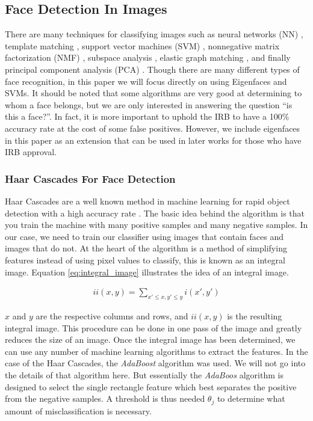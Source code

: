 \documentclass[
	submission,
	final,
	notitlepage,
	narroweqnarray,
	inline,
	twoside,
	]{ieee}
\begin{document}
\subsection{Face Detection In Images}
There are many techniques for classifying images such as neural
networks (NN) \cite{face_neural_net}, template matching \cite{face_template}, support vector machines (SVM) \cite{face_svm}, 
nonnegative matrix factorization (NMF) \cite{face_mat_fact}, subspace analysis \cite{face_subspace_analysis}, 
elastic graph matching \cite{face_elastic_bunch}, and finally principal component analysis (PCA) \cite{face_kpca}. 
Though there are many different types of face recognition, in this paper we 
will focus directly on using Eigenfaces and SVMs. It should be noted 
that some algorithms are very good at determining to whom a face
belongs, but we are only interested in answering the question  
``is this a face?''. In fact, it is more important to uphold the IRB
to have a 100\% accuracy rate at the cost of some false positives.
However, we include eigenfaces in this paper as 
an extension that can be used in later works for those who have IRB approval. 

\subsubsection{Haar Cascades For Face Detection}
Haar Cascades are a well known method in machine learning for rapid object
detection with a high accuracy rate \cite{haar_cascades}. The basic idea
behind the algorithm is that you train the machine with many positive samples
and many negative samples. In our case, we need to train our classifier using
images that contain faces and images that do not. At the heart of the algorithm
is a method of simplifying features instead of using pixel values to classify, 
this is known as an integral image. Equation \ref{eq:integral_image} illustrates
the idea of an integral image. 


\begin{align}
  ii(x,y) = \sum_{x' \leq x, y' \leq y} i(x', y') \label{eq:integral_image}
\end{align}

$x$ and $y$ are the respective columns and rows, and $ii(x,y)$ is the resulting integral
image. This procedure can be done in one pass of the image and greatly reduces
the size of an image. Once the integral image has been determined, we can use
any number of machine learning algorithms to extract the features. In the case of
the Haar Cascades, the \textit{AdaBoost} algorithm was used. We will not go
into the details of that algorithm here. But essentially the \textit{AdaBoos} algorithm 
is designed to select the single rectangle feature which best separates
the positive from the negative samples. A threshold is thus needed $\theta_j$
to determine what amount of misclassification is necessary. 
\end{document}
